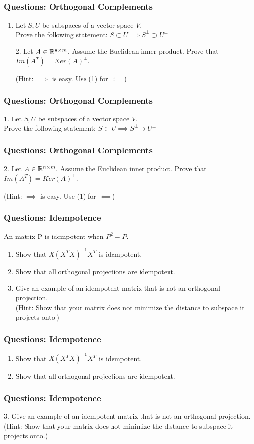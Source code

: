 \documentclass{beamer}
\begin{document}
\begin{frame}[t]
\frametitle{Questions: Orthogonal Complements}
\begin{enumerate}
\item Let $S, U$ be subspaces of a vector space $V$.\\
Prove the following statement:
$S\subset U \implies S^\perp \supset U^\perp$
\bigskip
\item[2.] Let $A\in\mathbb{R}^{n\times m}$.
Assume the Euclidean inner product. Prove that $Im(A^T) = Ker(A)^\perp$.

(Hint: $\implies$ is easy. Use (1) for $\impliedby$)
\end{enumerate}
\end{frame}

\begin{frame}[t]
\frametitle{Questions: Orthogonal Complements}
1. Let $S, U$ be subspaces of a vector space $V$.\\
Prove the following statement:
$S\subset U \implies S^\perp \supset U^\perp$
\end{frame}

\begin{frame}[t]
\frametitle{Questions: Orthogonal Complements}
2. Let $A\in\mathbb{R}^{n\times m}$.
Assume the Euclidean inner product. Prove that $Im(A^T) = Ker(A)^\perp$.

(Hint: $\implies$ is easy. Use (1) for $\impliedby$)
\pause
\end{frame}

\begin{frame}[t]
\frametitle{Questions: Idempotence}
\begin{definition}[Idempotence]
An matrix P is idempotent when $P^2=P$.
\end{definition}
\bigskip
\begin{enumerate}
\item Show that $X(X^TX)^{-1}X^T$ is idempotent.
\item Show that all orthogonal projections are idempotent.
\item Give an example of an idempotent matrix that is not an orthogonal projection.  \\
(Hint: Show that your matrix does not minimize the distance to subspace it projects onto.)
\end{enumerate}
\end{frame}

\begin{frame}[t]
\frametitle{Questions: Idempotence}
\begin{enumerate}
\item Show that $X(X^TX)^{-1}X^T$ is idempotent.
\item Show that all orthogonal projections are idempotent.
\pause
\end{enumerate}
\end{frame}

\begin{frame}[t]
\frametitle{Questions: Idempotence}
3. Give an example of an idempotent matrix that is not an orthogonal projection.  \\
(Hint: Show that your matrix does not minimize the distance to subspace it projects onto.)
\pause
\end{frame}
\end{document}
